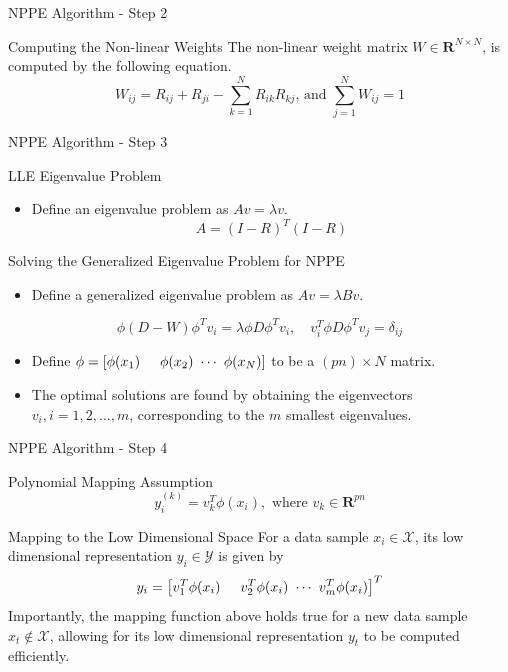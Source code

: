\documentclass{beamer}
\begin{document}
\begin{frame}{NPPE Algorithm - Step 2}
\begin{block}{Computing the Non-linear Weights}
The non-linear weight matrix $W\in\mathbf{R}^{N\times N}$, is computed by the following equation. 
\begin{equation}
W_{ij} = R_{ij} + R_{ji} - \sum_{k=1}^{N}{R_{ik}R_{kj} \text{, and } \sum_{j=1}^N{W_{ij}}=1}
\end{equation}
\end{block}
\end{frame}

\begin{frame}{NPPE Algorithm - Step 3}
\begin{block}{LLE Eigenvalue Problem}
\begin{itemize}[<+->]
    \item Define an eigenvalue problem as $Av=\lambda v$.
    \[A = (I-R)^T(I-R)\]
\end{itemize}
\end{block}
\pause
\begin{block}{Solving the Generalized Eigenvalue Problem for NPPE}
\begin{itemize}
    \item Define a generalized eigenvalue problem as $Av=\lambda Bv$.
\end{itemize}
\pause
\begin{equation}
\phi(D-W)\phi^Tv_i = \lambda \phi D\phi^Tv_i, \quad v_i^T\phi D\phi^Tv_j=\delta_{ij}
\end{equation}
\begin{itemize}[<+->]
    \item Define $\phi = \left[\phi(x_1) \hspace{0.5cm} \phi(x_2) \text{ }\cdots\text{ } \phi(x_N)\right]$ to be a $(pn) \times N$ matrix.
     \item The optimal solutions are found by obtaining the eigenvectors $v_i, i=1,2,...,m$, corresponding to the $m$ smallest eigenvalues.
\end{itemize}
\end{block}
\end{frame}

\begin{frame}{NPPE Algorithm - Step 4}
\begin{block}{Polynomial Mapping Assumption}
    \[y_{i}^{(k)} = v_k^T\phi(x_i), \text{ where } v_k \in \mathbf{R}^{pn}\]
\end{block}
\pause 
\begin{block}{Mapping to the Low Dimensional Space}
For a data sample $x_i \in \mathcal{X}$, its low dimensional representation $y_i \in \mathcal{Y}$ is given by
\begin{equation}
y_i = \left[ v_1^T\phi(x_i) \hspace{0.5cm} v_2^T\phi(x_i) \text{ }\cdots\text{ } v_m^T\phi(x_i)  \right]^T
\end{equation}
Importantly, the mapping function above holds true for a new data sample $x_t \notin \mathcal{X}$, allowing for its low dimensional representation $y_t$ to be computed efficiently. 
\end{block}
\end{frame}
\end{document}
